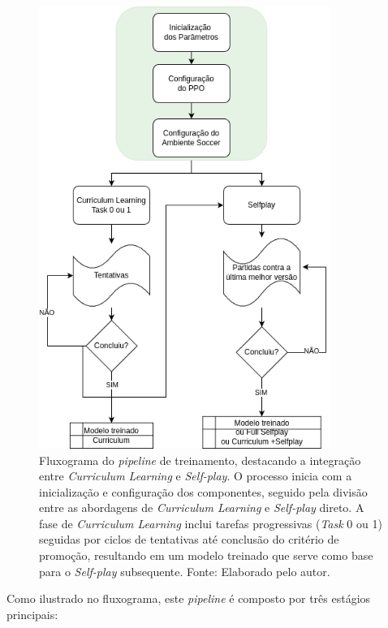 \begin{figure}[H]
    \centering
    \includegraphics[width=0.85\textwidth]{fig/fluxograma_treino_mestrado.png}
    \caption{Fluxograma do \textit{pipeline} de treinamento, destacando a integração entre \textit{Curriculum Learning} e \textit{Self-play}. O processo inicia com a inicialização e configuração dos componentes, seguido pela divisão entre as abordagens de \textit{Curriculum Learning} e \textit{Self-play} direto. A fase de \textit{Curriculum Learning} inclui tarefas progressivas (\textit{Task} 0 ou 1) seguidas por ciclos de tentativas até conclusão do critério de promoção, resultando em um modelo treinado que serve como base para o \textit{Self-play} subsequente. Fonte: Elaborado pelo autor.}
    \label{fig:fluxograma_treino}
\end{figure}

Como ilustrado no fluxograma, este \textit{pipeline} é composto por três estágios principais:

